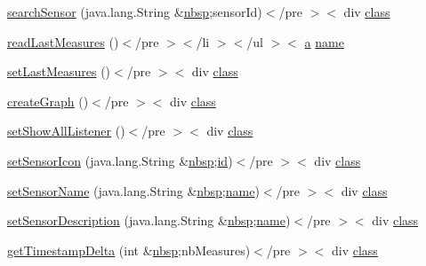 \begin{DoxyCompactItemize}
\item 
\hyperlink{_sensor_overview_activity_8html_afc25a55ebc29682277bb9f4d28b5be92}{search\-Sensor} (java.\-lang.\-String \&\hyperlink{_tools_8html_aef915316f784c9063d942974538301a6}{nbsp};sensor\-Id)$<$/pre $>$$<$ div \hyperlink{_tools_8html_acf06f836132665ba8114f5a414c2403f}{class}
\item 
\hyperlink{_sensor_overview_activity_8html_a5ecf9b22bcda664adf72acafa5702867}{read\-Last\-Measures} ()$<$/pre $>$$<$/li $>$$<$/ul $>$$<$ \hyperlink{style_8css_a5e8981582017bb8b84c21f148345d1f7}{a} \hyperlink{_cloudia_d_b_8html_ab74e6bf80237ddc4109968cedc58c151}{name}
\item 
\hyperlink{_sensor_overview_activity_8html_a5aad477f9bd7beed5e9ef807759b6206}{set\-Last\-Measures} ()$<$/pre $>$$<$ div \hyperlink{_tools_8html_acf06f836132665ba8114f5a414c2403f}{class}
\item 
\hyperlink{_sensor_overview_activity_8html_a5594751cf84a3e38d2f90327964b382a}{create\-Graph} ()$<$/pre $>$$<$ div \hyperlink{_tools_8html_acf06f836132665ba8114f5a414c2403f}{class}
\item 
\hyperlink{_sensor_overview_activity_8html_a7f0c4ce5afd8c9785f72df975c815e93}{set\-Show\-All\-Listener} ()$<$/pre $>$$<$ div \hyperlink{_tools_8html_acf06f836132665ba8114f5a414c2403f}{class}
\item 
\hyperlink{_sensor_overview_activity_8html_aa4078d40e86af191850bb1255dd479f8}{set\-Sensor\-Icon} (java.\-lang.\-String \&\hyperlink{_tools_8html_aef915316f784c9063d942974538301a6}{nbsp};\hyperlink{index-9_8html_aa9b8ff1d03b739d1e752b9d9a5aa7c98}{id})$<$/pre $>$$<$ div \hyperlink{_tools_8html_acf06f836132665ba8114f5a414c2403f}{class}
\item 
\hyperlink{_sensor_overview_activity_8html_a27b9a6837241cee99285f4dcaa6c9e28}{set\-Sensor\-Name} (java.\-lang.\-String \&\hyperlink{_tools_8html_aef915316f784c9063d942974538301a6}{nbsp};\hyperlink{_cloudia_d_b_8html_ab74e6bf80237ddc4109968cedc58c151}{name})$<$/pre $>$$<$ div \hyperlink{_tools_8html_acf06f836132665ba8114f5a414c2403f}{class}
\item 
\hyperlink{_sensor_overview_activity_8html_a5664a9f989fade1660ce60b7acd83679}{set\-Sensor\-Description} (java.\-lang.\-String \&\hyperlink{_tools_8html_aef915316f784c9063d942974538301a6}{nbsp};\hyperlink{_cloudia_d_b_8html_ab74e6bf80237ddc4109968cedc58c151}{name})$<$/pre $>$$<$ div \hyperlink{_tools_8html_acf06f836132665ba8114f5a414c2403f}{class}
\item 
\hyperlink{_sensor_overview_activity_8html_a622d69a3141de80d8950943848429d23}{get\-Timestamp\-Delta} (int \&\hyperlink{_tools_8html_aef915316f784c9063d942974538301a6}{nbsp};nb\-Measures)$<$/pre $>$$<$ div \hyperlink{_tools_8html_acf06f836132665ba8114f5a414c2403f}{class}
\end{DoxyCompactItemize}
